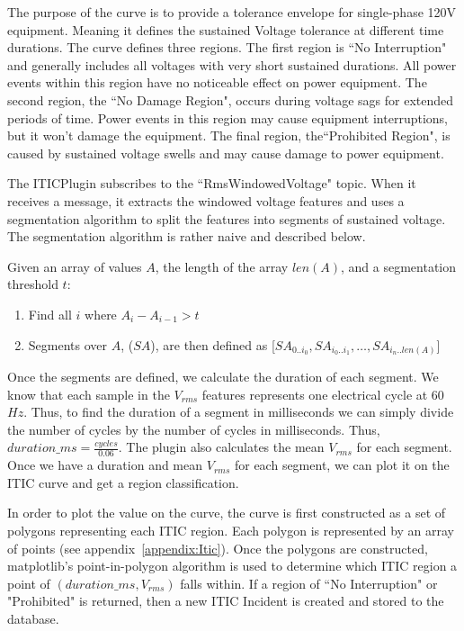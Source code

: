 The purpose of the curve is to provide a tolerance envelope for single-phase 120V equipment. Meaning it defines the sustained Voltage tolerance at different time durations. The curve defines three regions. The first region is ``No Interruption" and generally includes all voltages with very short sustained durations. All power events within this region have no noticeable effect on power equipment. The second region, the ``No Damage Region", occurs during voltage sags for extended periods of time. Power events in this region may cause equipment interruptions, but it won't damage the equipment. The final region, the``Prohibited Region", is caused by sustained voltage swells and may cause damage to power equipment.

The ITICPlugin subscribes to the ``RmsWindowedVoltage" topic. When it receives a message, it extracts the windowed voltage features and uses a segmentation algorithm to split the features into segments of sustained voltage. The segmentation algorithm is rather naive and described below.

Given an array of values $A$, the length of the array $len(A)$, and a segmentation threshold $t$:
\begin{enumerate}
	\item Find all $i$ where $A_i - A_{i-1} > t$
	\item Segments over $A$, ($SA$), are then defined as [$SA_{0..i_0}, SA_{i_0..i_1}, \dots, SA_{i_n..len(A)}$]
\end{enumerate}

Once the segments are defined, we calculate the duration of each segment. We know that each sample in the $V_{rms}$ features represents one electrical cycle at 60$Hz$. Thus, to find the duration of a segment in milliseconds we can simply divide the number of cycles by the number of cycles in milliseconds. Thus, $duration\_ms = \frac{cycles}{0.06}$. The plugin also calculates the mean $V_{rms}$ for each segment. Once we have a duration and mean $V_{rms}$ for each segment, we can plot it on the ITIC curve and get a region classification.

In order to plot the value on the curve, the curve is first constructed as a set of polygons representing each ITIC region. Each polygon is represented by an array of points (see appendix~\ref{appendix:Itic}). Once the polygons are constructed, matplotlib's point-in-polygon algorithm is used to determine which ITIC region a point of $(duration\_ms, V_{rms})$ falls within. If a region of ``No Interruption" or "Prohibited" is returned, then a new ITIC Incident is created and stored to the database.

